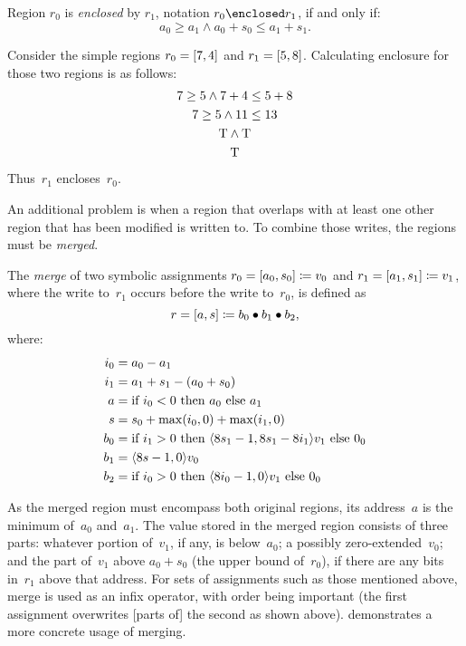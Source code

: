 \begin{definition}[Enclosure]
  Region $r_0$ is \emph{enclosed} by $r_1$, notation $r_0\enclosed r_1$,
  if and only if:
  \begin{equation*}
    a_0\geq a_1\wedge a_0+s_0\leq a_1+s_1.
  \end{equation*}
\end{definition}
\begin{example}
  Consider the simple regions $r_0=[7,4]$ and $r_1=[5,8]$.
  Calculating enclosure for those two regions is as follows:
  \begin{gather*}
    7\geq 5\wedge 7+4\leq 5+8 \\
    7\geq 5\wedge 11\leq 13 \\
    \mathrm{T}\wedge\mathrm{T} \\
    \mathrm{T}
  \end{gather*}
  Thus~$r_1$ encloses~$r_0$.
\end{example}

An additional problem is when a region that overlaps with at least one other region
that has been modified is written to.
To combine those writes, the regions must be \emph{merged}.%
\begin{definition}[Merging]\label{def:merge}
  The \emph{merge} of two symbolic assignments
  $r_0=[a_0,s_0]\coloneqq v_0$ and $r_1=[a_1,s_1]\coloneqq v_1$,
  where the write to~$r_1$ occurs before the write to~$r_0$,
  is defined as
  \begin{equation}
    r=[a,s]\coloneqq b_0\bullet b_1\bullet b_2,
  \end{equation}
  where:
  \begin{align*}
  i_0 &= a_0 - a_1 \\
  i_1 &= a_1 + s_1 - (a_0 + s_0) \\
  a   &= \text{if } i_0 < 0 \text{ then } a_0 \text{ else } a_1 \\
  s   &= s_0 + \max(i_0, 0) + \max(i_1, 0) \\
  b_0 &= \text{if } i_1 > 0 \text{ then }
  \langle8 s_1-1,8 s_1 - 8 i_1\rangle v_1 \text{ else } 0_0 \\
  b_1 &= \langle8 s-1, 0\rangle v_0 \\
  b_2 &= \text{if } i_0 > 0 \text{ then } \langle8 i_0-1, 0\rangle v_1 \text{ else } 0_0
  \end{align*}
\end{definition}
As the merged region must encompass both original regions,
its address~$a$ is the minimum of~$a_0$ and~$a_1$.
The value stored in the merged region consists of three parts:
whatever portion of~$v_1$, if any, is below~$a_0$;
a possibly zero-extended~$v_0$;
and the part of~$v_1$ above $a_0+s_0$ (the upper bound of~$r_0$),
if there are any bits in~$r_1$ above that address.
For sets of assignments such as those mentioned above,
merge is used as an infix operator, with order being important
(the first assignment overwrites [parts of] the second as shown above).
 demonstrates a more concrete usage of merging.

